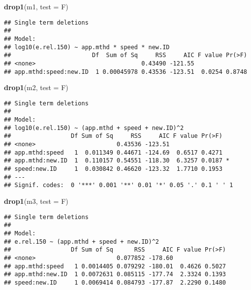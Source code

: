 \documentclass[
]{article}
\newenvironment{Shaded}{\begin{snugshade}}{\end{snugshade}}
\newcommand{\AttributeTok}[1]{\textcolor[rgb]{0.13,0.29,0.53}{#1}}
\newcommand{\FunctionTok}[1]{\textcolor[rgb]{0.13,0.29,0.53}{\textbf{#1}}}
\newcommand{\NormalTok}[1]{#1}
\newcommand{\StringTok}[1]{\textcolor[rgb]{0.31,0.60,0.02}{#1}}
\begin{document}
\begin{Shaded}
\begin{Highlighting}[]
\FunctionTok{drop1}\NormalTok{(m1, }\AttributeTok{test =} \StringTok{\textquotesingle{}F\textquotesingle{}}\NormalTok{)}
\end{Highlighting}
\end{Shaded}

\begin{verbatim}
## Single term deletions
## 
## Model:
## log10(e.rel.150) ~ app.mthd * speed * new.ID
##                       Df  Sum of Sq     RSS     AIC F value Pr(>F)
## <none>                              0.43490 -121.55               
## app.mthd:speed:new.ID  1 0.00045978 0.43536 -123.51  0.0254 0.8748
\end{verbatim}

\begin{Shaded}
\begin{Highlighting}[]
\FunctionTok{drop1}\NormalTok{(m2, }\AttributeTok{test =} \StringTok{\textquotesingle{}F\textquotesingle{}}\NormalTok{)}
\end{Highlighting}
\end{Shaded}

\begin{verbatim}
## Single term deletions
## 
## Model:
## log10(e.rel.150) ~ (app.mthd + speed + new.ID)^2
##                 Df Sum of Sq     RSS     AIC F value Pr(>F)  
## <none>                       0.43536 -123.51                 
## app.mthd:speed   1  0.011349 0.44671 -124.69  0.6517 0.4271  
## app.mthd:new.ID  1  0.110157 0.54551 -118.30  6.3257 0.0187 *
## speed:new.ID     1  0.030842 0.46620 -123.32  1.7710 0.1953  
## ---
## Signif. codes:  0 '***' 0.001 '**' 0.01 '*' 0.05 '.' 0.1 ' ' 1
\end{verbatim}

\begin{Shaded}
\begin{Highlighting}[]
\FunctionTok{drop1}\NormalTok{(m3, }\AttributeTok{test =} \StringTok{\textquotesingle{}F\textquotesingle{}}\NormalTok{)}
\end{Highlighting}
\end{Shaded}

\begin{verbatim}
## Single term deletions
## 
## Model:
## e.rel.150 ~ (app.mthd + speed + new.ID)^2
##                 Df Sum of Sq      RSS     AIC F value Pr(>F)
## <none>                       0.077852 -178.60               
## app.mthd:speed   1 0.0014405 0.079292 -180.01  0.4626 0.5027
## app.mthd:new.ID  1 0.0072631 0.085115 -177.74  2.3324 0.1393
## speed:new.ID     1 0.0069414 0.084793 -177.87  2.2290 0.1480
\end{verbatim}
\end{document}
